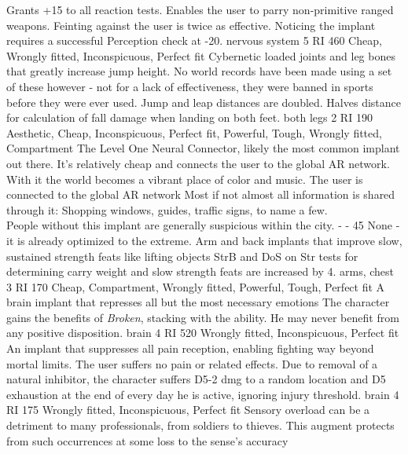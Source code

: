 \begin{multicols}{2}
    {Grants +15 to all reaction tests. Enables the user to parry non-primitive ranged weapons.
	   Feinting against the user is twice as effective.
       Noticing the implant requires a successful Perception check at -20.}
    {nervous system}
    {5 RI}
    {460}
    {Cheap, Wrongly fitted, Inconspicuous, Perfect fit}
    {Cybernetic loaded joints and leg bones that greatly increase jump height. No world records have been made using a set of these however - not for a lack of effectiveness, they were banned in sports before they were ever used.}
    {Jump and leap distances are doubled. Halves distance for calculation of fall damage when landing on both feet.}
    {both legs}
    {2 RI}
    {190}
    {Aesthetic, Cheap, Inconspicuous, Perfect fit, Powerful, Tough, Wrongly fitted, Compartment}
	{
		\label{implant:l1nc}
	The Level One Neural Connector, likely the most common implant out there.
	It's relatively cheap and connects the user to the global AR network.
	With it the world becomes a vibrant place of color and music.}
	{The user is connected to the global AR network
	Most if not almost all information is shared through it:
	Shopping windows,
		guides,
		traffic signs,
		to name a few.
	\\%
	People without this implant are generally suspicious within the city.
	}
	{-}
	{-}
	{45}
	{None - it is already optimized to the extreme.}
    {Arm and back implants that improve slow, sustained strength feats like lifting objects}
    {StrB and DoS on Str tests for determining carry weight and slow strength feats are increased by 4.}
    {arms, chest}
    {3 RI}
    {170}
    {Cheap, Compartment, Wrongly fitted, Powerful, Tough, Perfect fit}
    {A brain implant that represses all but the most necessary emotions}
    {The character gains the benefits of \emph{Broken}, stacking with the ability. He may never benefit from any positive disposition.}
    {brain}
    {4 RI}
    {520}
    {Wrongly fitted, Inconspicuous, Perfect fit}
    {An implant that suppresses all pain reception, enabling fighting way beyond mortal limits.}
    {The user suffers no pain or related effects.
	   Due to removal of a natural inhibitor, the character suffers D5-2 dmg to a random location and D5 exhaustion at the end of every day he is active, ignoring injury threshold.}
    {brain}
    {4 RI}
    {175}
    {Wrongly fitted, Inconspicuous, Perfect fit}
    {Sensory overload can be a detriment to many professionals, from soldiers to thieves. This augment protects from such occurrences at some loss to the sense's accuracy}

\end{multicols}
